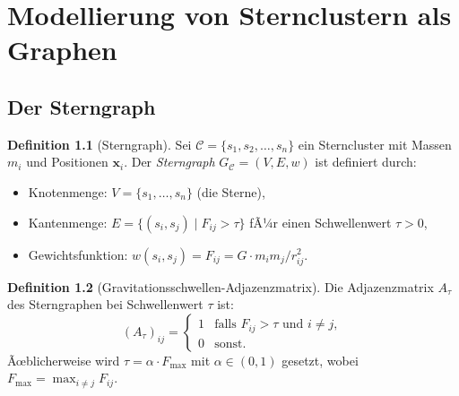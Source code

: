 ﻿\documentclass[a4paper,12pt]{report}
\theoremstyle{definition}
\newtheorem{definition}{Definition}
\begin{document}
\chapter{Modellierung von Sternclustern als Graphen}

\section{Der Sterngraph}

\begin{definition}[Sterngraph]
Sei $\mathcal{C} = \{s_1, s_2, \ldots, s_n\}$ ein Sterncluster mit Massen $m_i$ und Positionen $\mathbf{x}_i$. Der \emph{Sterngraph} $G_\mathcal{C} = (V, E, w)$ ist definiert durch:
\begin{itemize}
    \item Knotenmenge: $V = \{s_1, \ldots, s_n\}$ (die Sterne),
    \item Kantenmenge: $E = \{(s_i, s_j) \mid F_{ij} > \tau\}$ fÃ¼r einen Schwellenwert $\tau > 0$,
    \item Gewichtsfunktion: $w(s_i, s_j) = F_{ij} = G \cdot m_i m_j / r_{ij}^2$.
\end{itemize}
\end{definition}

\begin{definition}[Gravitationsschwellen-Adjazenzmatrix]
Die Adjazenzmatrix $A_\tau$ des Sterngraphen bei Schwellenwert $\tau$ ist:
\[
(A_\tau)_{ij} = \begin{cases}
    1 & \text{falls } F_{ij} > \tau \text{ und } i \neq j, \\
    0 & \text{sonst.}
\end{cases}
\]
Ãœblicherweise wird $\tau = \alpha \cdot F_\mathrm{max}$ mit $\alpha \in (0, 1)$ gesetzt, wobei $F_\mathrm{max} = \max_{i \neq j} F_{ij}$.
\end{definition}
\end{document}

